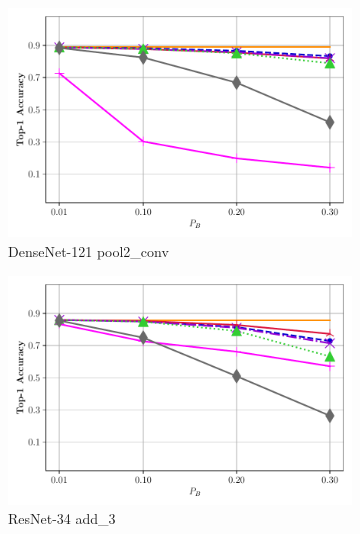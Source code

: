 \documentclass[aspectratio=169]{beamer}
\begin{document}
\begin{frame}
\begin{figure}[H]
		\begin{subfigure}{.275\textwidth}
			\centering
			\includegraphics[width = \textwidth]{lp_vcip_rpp_8_top1_densenet121_pool2_conv.pdf}
			\vspace*{-8mm}\caption{DenseNet-121 pool2\_conv}
		\end{subfigure}%
		\hfill 
		\begin{subfigure}{.275\textwidth}
			\centering
			\includegraphics[width=\textwidth]{lp_vcip_rpp_8_top1_resnet34_add_3.pdf}
			\vspace*{-8mm}\caption{ResNet-34 add\_3}
		\end{subfigure}%
		\hfill
		\begin{subfigure}{.275\textwidth}
			\centering

\end{subfigure}
\end{figure}
\end{frame}
\end{document}
